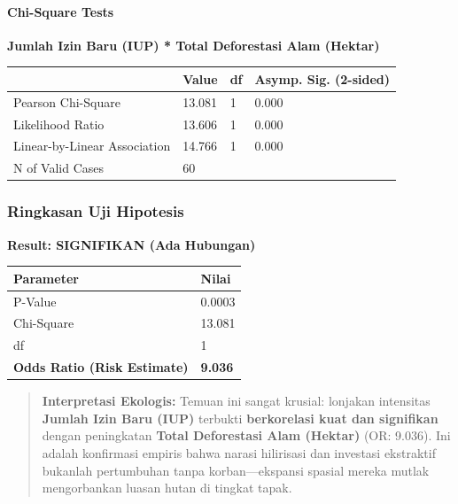 \documentclass[
]{article}
\newcounter{none} %
\begin{document}
\paragraph{Chi-Square Tests}\label{chi-square-tests}

\textbf{Jumlah Izin Baru (IUP) * Total Deforestasi Alam (Hektar)}

{\def\LTcaptype{none} %
\begin{longtable}[]{@{}llll@{}}
\toprule\noalign{}
& Value & df & Asymp. Sig. (2-sided) \\
\midrule\noalign{}
\endhead
\bottomrule\noalign{}
\endlastfoot
Pearson Chi-Square & 13.081 & 1 & 0.000 \\
Likelihood Ratio & 13.606 & 1 & 0.000 \\
Linear-by-Linear Association & 14.766 & 1 & 0.000 \\
N of Valid Cases & 60 & & \\
\end{longtable}
}

\subsubsection{Ringkasan Uji Hipotesis}\label{ringkasan-uji-hipotesis}

\textbf{Result: SIGNIFIKAN (Ada Hubungan)}

{\def\LTcaptype{none} %
\begin{longtable}[]{@{}ll@{}}
\toprule\noalign{}
Parameter & Nilai \\
\midrule\noalign{}
\endhead
\bottomrule\noalign{}
\endlastfoot
P-Value & 0.0003 \\
Chi-Square & 13.081 \\
df & 1 \\
\textbf{Odds Ratio (Risk Estimate)} & \textbf{9.036} \\
\end{longtable}
}

\begin{quote}
\textbf{Interpretasi Ekologis:} Temuan ini sangat krusial: lonjakan
intensitas \textbf{Jumlah Izin Baru (IUP)} terbukti \textbf{berkorelasi
kuat dan signifikan} dengan peningkatan \textbf{Total Deforestasi Alam
(Hektar)} (OR: 9.036). Ini adalah konfirmasi empiris bahwa narasi
hilirisasi dan investasi ekstraktif bukanlah pertumbuhan tanpa
korban---ekspansi spasial mereka mutlak mengorbankan luasan hutan di
tingkat tapak.
\end{quote}
\end{document}

